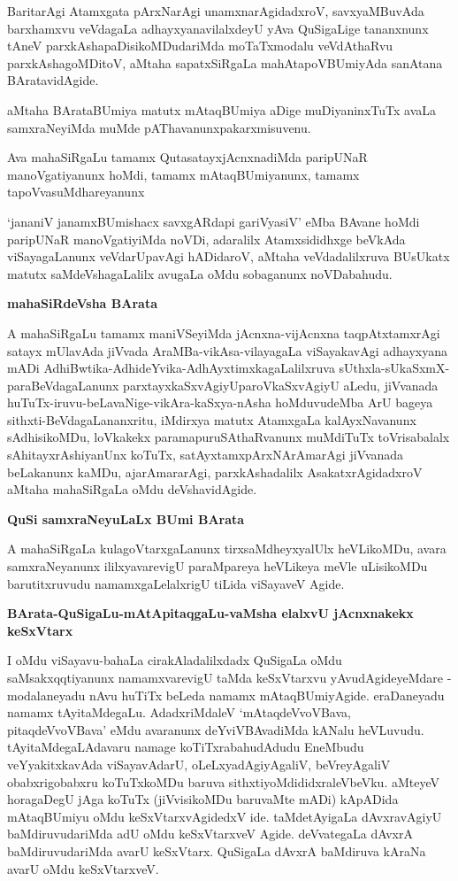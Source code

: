 \noindent Barita\-rAgi Atamxgata pArxNarAgi unamxnarAgidadxroV, savxyaMBuvAda barxhamxvu veVda\-gaLa adhayxyanavilalxdeyU yAva QuSigaLige tananxnunx tAneV parxkAshapaDisikoMDuda\-riMda moTaTxmodalu veVdAthaRvu parxkAshagoM\-DitoV, aMtaha sapatxSiRgaLa mahAtapoVBUmiyAda sanAtana BAratavidAgide.

aMtaha BArataBUmiya matutx mAtaqBUmiya aDige muDiyaninxTuTx avaLa samxraNeyiMda muM\-de pAThavanunxpakarxmisuvenu.

Ava mahaSiRgaLu tamamx QutasatayxjAcnxnadiMda paripUNaR manoVgatiyanunx hoMdi, tamamx mAtaq\-BUmi\-yanunx, tamamx tapoVvasuMdhareyanunx 

`jananiV janamxBUmishacx savxgARdapi gariVyasiV'\label{103} eMba BAvane hoMdi pari\-pUNaR manoVgatiyiMda noVDi, adaralilx Atamxsididhxge beVkAda viSayagaLanunx veVdarUpavAgi hADidaroV, aMtaha veVdadalilxruva BUsUkatx matutx saMdeVsha\-gaLalilx avugaLa oMdu sobaganunx noVDabahudu.

{\bigskip
\noindent
{\large\bf mahaSiRdeVsha BArata}}\label{page103}
\medskip

\noindent
A mahaSiRgaLu tamamx maniVSeyiMda jAcnxna-vijAcnxna taqpAtxtamxrAgi satayx mUlavAda jiVvada AraMBa-\-vikAsa-vilayagaLa viSayakavAgi adhayxyana mADi AdhiBwtika-\-AdhideYvika-AdhAyxtimxkagaLalilxruva sUthxla-sUkaSxmX-paraBeVdagaLanunx parxtayxkaSxvAgiyU\break paroVkaSxvAgiyU aLedu, jiVvanada huTuTx-iruvu-beLava\-Nige-vikAra-kaSxya-\-nAsha hoMduvudeMba ArU bageya sithxti-BeVdagaLananxritu, iMdirxya matutx Atamx\-gaLa kalAyxNavanunx sAdhisikoMDu, loVkakekx paramapuruSAthaRvanunx muMdiTuTx toVrisabalalx sAhitayx\-rAshiyanUnx koTuTx, satAyxtamxpArxNArAmarAgi jiVvanada beLakanunx kaMDu, ajarAmararAgi, parxkAsha\-dalilx AsakatxrAgidadxroV aMtaha mahaSiRgaLa oMdu deVshavidAgide.

\eject

{\bigskip
\noindent
{\large\bf QuSi samxraNeyuLaLx BUmi BArata}}\label{page104}
\medskip

\noindent
A mahaSiRgaLa kulagoVtarxgaLanunx tirxsaMdheyxyalUlx heVLikoMDu, avara samxraNe\break\-yanunx ililxyavare\-vigU paraMpareya heVLikeya meVle uLisikoMDu barutitxru\-vudu namamxgaLelalxrigU tiLida viSayaveV Agide.

{\bigskip
\noindent
{\large\bf BArata-QuSigaLu-mAtApitaqgaLu-vaMsha elalxvU jAcnxnakekx keSxVtarx}}\label{page104}
\medskip

\noindent
I oMdu viSayavu-bahaLa cirakAladalilxdadx QuSigaLa oMdu saMsakxqqtiyanunx namamxvarevigU taMda keSxVtarx\-vu yAvudAgideyeMdare - modalaneyadu nAvu huTiTx beLeda namamx mAtaqBUmiyAgide. eraDa\-neyadu namamx tAyitaMdegaLu. AdadxriMdaleV `mAtaqdeVvoVBava, pitaqdeVvoVBava' eMdu ava\-ranunx deYviVBAvadiMda kANalu heVLuvudu. tAyitaMdegaLAdavaru namage koTiTxrabahudAdudu EneM\-budu veYyakitxkavAda viSayavAdarU, oLeLxyadAgiyAgaliV, beVreyAgaliV obabxrigobabxru koTuTx\-koMDu baruva sithxtiyoMdididxraleVbeVku. aMteyeV horagaDegU jAga koTuTx (jiVvisikoMDu baru\-vaMte mADi) kApADida mAtaqBUmiyu oMdu keSxVtarxvAgidedxV ide. taMdetAyigaLa dAvxravAgiyU baMdiru\-vudariMda adU oMdu keSxVtarxveV Agide. deVvategaLa dAvxrA baMdiruvudariMda avarU keSxVtarx. QuSigaLa dAvxrA baMdiruva kAraNa avarU oMdu keSxVtarxveV.

